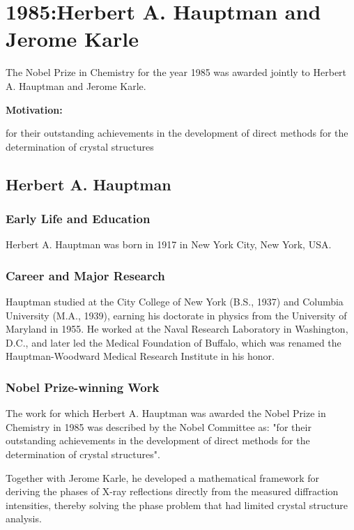 \chapter{1985:Herbert A. Hauptman and Jerome Karle}

\label{chap:chemistry1985}

The Nobel Prize in Chemistry for the year 1985 was awarded jointly to Herbert A. Hauptman and Jerome Karle.

\textbf{Motivation:}

for their outstanding achievements in the development of direct methods for the determination of crystal structures

\section{Herbert A. Hauptman}

\subsection*{Early Life and Education}

Herbert A. Hauptman was born in 1917 in New York City, New York, USA.

\subsection*{Career and Major Research}

Hauptman studied at the City College of New York (B.S., 1937) and Columbia University (M.A., 1939), earning his doctorate in physics from the University of Maryland in 1955. He worked at the Naval Research Laboratory in Washington, D.C., and later led the Medical Foundation of Buffalo, which was renamed the Hauptman-Woodward Medical Research Institute in his honor.

\subsection*{Nobel Prize-winning Work}

The work for which Herbert A. Hauptman was awarded the Nobel Prize in Chemistry in 1985 was described by the Nobel Committee as: "for their outstanding achievements in the development of direct methods for the determination of crystal structures".

Together with Jerome Karle, he developed a mathematical framework for deriving the phases of X-ray reflections directly from the measured diffraction intensities, thereby solving the phase problem that had limited crystal structure analysis.


